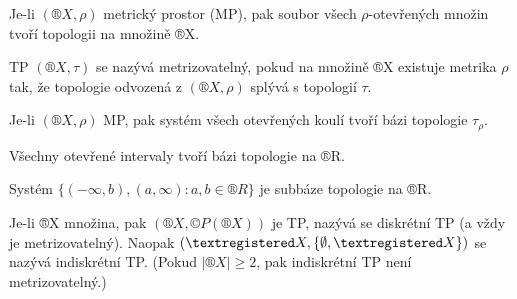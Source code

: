 \documentclass[12pt]{article}					%
\begin{document}
    \begin{priklad}
        Je-li $(®X, \rho)$ metrický prostor (MP), pak soubor všech $\rho$-otevřených množin tvoří topologii na množině ®X.
    \end{priklad}

    \begin{definice}[Metrizovatelný TP]
        TP $(®X, \tau)$ se nazývá metrizovatelný, pokud na množině ®X existuje metrika $\rho$ tak, že topologie odvozená z $(®X, \rho)$ splývá s topologií $\tau$.
    \end{definice}

    \begin{priklady}
        Je-li $(®X, \rho)$ MP, pak systém všech otevřených koulí tvoří bázi topologie $\tau_\rho$.
        \begin{prikladyin}
            Všechny otevřené intervaly tvoří bázi topologie na ®R.
            
            Systém $\{(-\infty, b), (a, \infty): a,b \in ®R\}$ je subbáze topologie na ®R.
        \end{prikladyin}
    \end{priklady}

    \begin{priklady}
        Je-li ®X množina, pak $(®X, ©P(®X))$ je TP, nazývá se diskrétní TP (a vždy je metrizovatelný). Naopak $(®X, \{\O, ®X\})$ se nazývá indiskrétní TP. (Pokud $|®X| ≥ 2$, pak indiskrétní TP není metrizovatelný.)
    \end{priklady}
\end{document}
